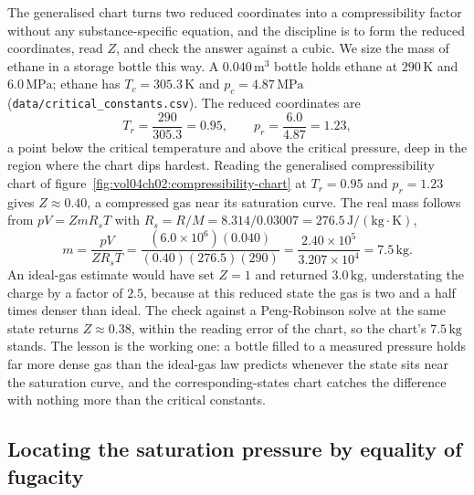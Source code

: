 The generalised chart turns two reduced coordinates into a compressibility
factor without any substance-specific equation, and the discipline is to
form the reduced coordinates, read $Z$, and check the answer against a
cubic. We size the mass of ethane in a storage bottle this way. A
$0.040\,\text{m}^3$ bottle holds ethane at $290\,\si{\kelvin}$ and
$6.0\,\text{MPa}$; ethane has $T_c = 305.3\,\si{\kelvin}$ and $p_c =
4.87\,\text{MPa}$ (\texttt{data/critical\_constants.csv}). The reduced
coordinates are
\[
T_r = \frac{290}{305.3} = 0.95, \qquad p_r = \frac{6.0}{4.87} = 1.23,
\]
a point below the critical temperature and above the critical pressure,
deep in the region where the chart dips hardest. Reading the generalised
compressibility chart of figure~\ref{fig:vol04ch02:compressibility-chart}
at $T_r = 0.95$ and $p_r = 1.23$ gives $Z \approx 0.40$, a compressed gas
near its saturation curve. The real mass follows from $pV = Z m R_s T$ with
$R_s = R/M = 8.314/0.03007 = 276.5\,\text{J}/(\text{kg}\cdot\si{\kelvin})$,
\[
m = \frac{pV}{Z R_s T} = \frac{(6.0\times 10^6)(0.040)}{(0.40)(276.5)(290)}
= \frac{2.40\times 10^5}{3.207\times 10^4} = 7.5\,\text{kg}.
\]
An ideal-gas estimate would have set $Z = 1$ and returned $3.0\,\text{kg}$,
understating the charge by a factor of $2.5$, because at this reduced state
the gas is two and a half times denser than ideal. The check against a
Peng-Robinson solve at the same state returns $Z \approx 0.38$, within the
reading error of the chart, so the chart's $7.5\,\text{kg}$ stands. The
lesson is the working one: a bottle filled to a measured pressure holds far
more dense gas than the ideal-gas law predicts whenever the state sits near
the saturation curve, and the corresponding-states chart catches the
difference with nothing more than the critical constants.

\subsection{Locating the saturation pressure by equality of fugacity}

